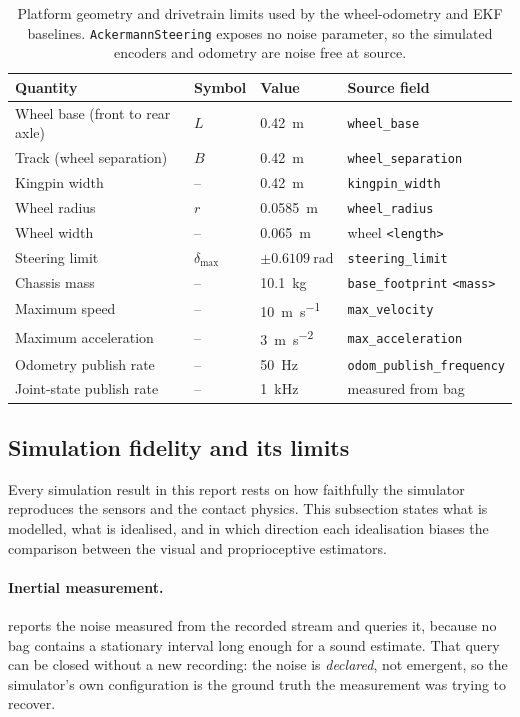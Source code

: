 \begin{table}[htbp]
\centering
\caption{Platform geometry and drivetrain limits used by the wheel-odometry and
EKF baselines. \texttt{AckermannSteering} exposes no noise parameter, so the
simulated encoders and odometry are noise free at source.}
\label{tab:platform-geometry}
\small
\begin{tabular}{llll}
\toprule
Quantity & Symbol & Value & Source field \\
\midrule
Wheel base (front to rear axle) & $L$ & \SI{0.42}{\metre} & \texttt{wheel\_base} \\
Track (wheel separation) & $B$ & \SI{0.42}{\metre} & \texttt{wheel\_separation} \\
Kingpin width & -- & \SI{0.42}{\metre} & \texttt{kingpin\_width} \\
Wheel radius & $r$ & \SI{0.0585}{\metre} & \texttt{wheel\_radius} \\
Wheel width & -- & \SI{0.065}{\metre} & wheel \texttt{<length>} \\
Steering limit & $\delta_{\max}$ & $\pm\SI{0.6109}{\radian}$ & \texttt{steering\_limit} \\
Chassis mass & -- & \SI{10.1}{\kilogram} & \texttt{base\_footprint} \texttt{<mass>} \\
Maximum speed & -- & \SI{10}{\metre\per\second} & \texttt{max\_velocity} \\
Maximum acceleration & -- & \SI{3}{\metre\per\second\squared} & \texttt{max\_acceleration} \\
Odometry publish rate & -- & \SI{50}{\hertz} & \texttt{odom\_publish\_frequency} \\
Joint-state publish rate & -- & \SI{1}{\kilo\hertz} & measured from bag \\
\bottomrule
\end{tabular}
\end{table}

\subsection{Simulation fidelity and its limits}
\label{sec:sim-fidelity}

Every simulation result in this report rests on how faithfully the simulator
reproduces the sensors and the contact physics. This subsection states what is
modelled, what is idealised, and in which direction each idealisation biases the
comparison between the visual and proprioceptive estimators.

\paragraph{Inertial measurement.}  reports the noise
measured from the recorded stream and queries it, because no
 bag contains a stationary interval long enough for a
sound estimate. That query can be closed without a new recording: the noise is
\emph{declared}, not emergent, so the simulator's own configuration is the
ground truth the measurement was trying to recover.

